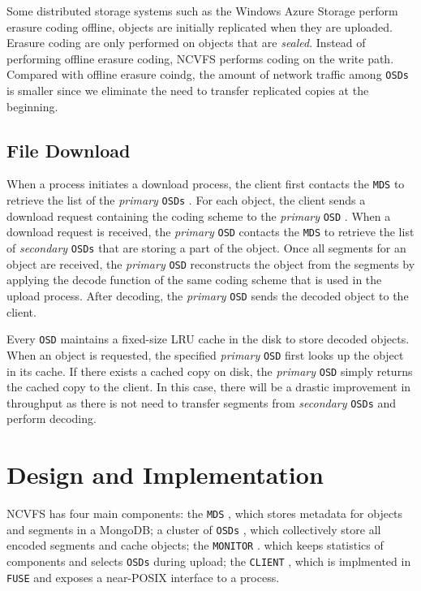 \documentclass{article}
\def\osd{\texttt{OSD} }
\def\osds{\texttt{OSDs} }
\def\mds{\texttt{MDS} }
\def\fuse{\texttt{FUSE} }
\def\client{\texttt{CLIENT} }
\def\monitor{\texttt{MONITOR} }
\begin{document}
Some distributed storage systems such as the Windows Azure Storage perform erasure coding offline, objects are
initially replicated when they are uploaded. Erasure coding are only performed on objects that are \textit{sealed}.
Instead of performing offline erasure coding, NCVFS performs coding on the write path. 
Compared with offline erasure coindg, the amount of network traffic among \osds is smaller since we eliminate the
need to transfer replicated copies at the beginning.

\subsection{File Download}

When a process initiates a download process, the client first contacts the \mds to retrieve the list of the \textit{primary} \osds. For each object, 
the client sends a download request containing the coding scheme to the \textit{primary} \osd. When a download request is received, the \textit{primary} \osd 
contacts the \mds to retrieve the list of \textit{secondary} \osds that are storing a part of the object. 
Once all segments for an object are received, the \textit{primary} \osd reconstructs the object from the segments by 
applying the decode function of the same coding scheme that is used in the upload process. After decoding, the \textit{primary} \osd sends the 
decoded object to the client. 

Every \osd maintains a fixed-size LRU cache in the disk to store decoded objects. When an object is requested, the specified \textit{primary} \osd first looks 
up the object in its cache. If there exists a cached copy on disk, the \textit{primary} \osd simply returns the cached copy to the client. 
In this case, there will be a drastic improvement in throughput as there is not need to transfer segments from \textit{secondary} \osds and perform decoding.

\section{Design and Implementation}
\label{design_and_impl}

NCVFS has four main components: the \mds, which stores metadata for objects and segments in a MongoDB; a cluster of \osds, 
which collectively store all encoded segments and cache objects; the \monitor. which keeps statistics of components and selects 
\osds during upload; the \client, which is implmented in \fuse and exposes a near-POSIX interface to a process.
\end{document}
